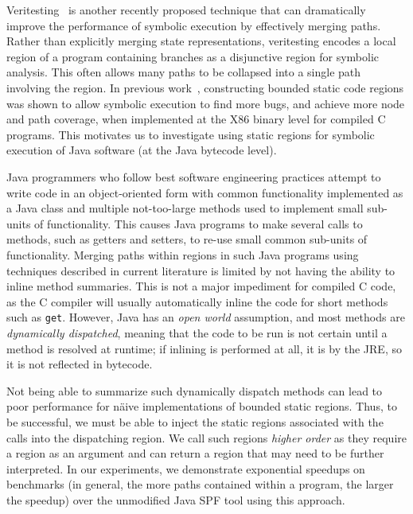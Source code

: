 %
 
%
Veritesting~\cite{veritesting} is another recently proposed technique that can dramatically improve the performance of symbolic execution by effectively merging paths.  Rather than explicitly merging state representations, veritesting encodes a local region of a program containing branches as a disjunctive region for symbolic analysis. This often allows many paths to be collapsed into a single path involving the region.  
%
In previous work~\cite{veritesting}, constructing bounded static code regions was shown to allow symbolic execution to find more bugs, and achieve more
node and path coverage, when implemented at the X86 binary level for compiled C programs.
%
This motivates us to investigate using static regions for symbolic execution of Java software (at the Java bytecode level).

Java programmers who follow best software engineering practices attempt to write code in an object-oriented
form with common functionality implemented as a Java class and multiple not-too-large methods used to implement small
sub-units of functionality.
%
This causes Java programs to make several calls to methods, such as getters and setters, to re-use small common sub-units
of functionality.
%
Merging paths within regions in such Java programs using techniques described in current literature is limited by not having the ability
to inline method summaries.
%
This is not a major impediment for compiled C code, as the C compiler will usually automatically inline the code for short
methods such as \texttt{get}.
%
However, Java has an {\em open world} assumption, and most methods are {\em dynamically dispatched}, meaning that the code to be
run is not certain until a method is resolved at runtime; if inlining is performed at all, it is by the JRE, so it is not reflected in bytecode.

Not being able to summarize such dynamically dispatch methods can lead to poor performance for
n\"aive implementations of bounded static regions.
%
Thus, to be successful, we must be able to inject the static regions associated with the calls into the dispatching
region.
%
We call such regions {\em higher order} as they require a region as an argument and can return a region that may need
to be further interpreted.
%
In our experiments, we demonstrate exponential speedups on benchmarks (in general, the more paths contained within a
program, the larger the speedup) over the unmodified Java SPF tool using this approach.

